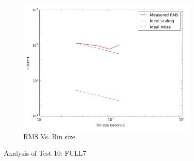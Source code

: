 \documentclass[conference]{IEEEtran}
\begin{document}
\begin{figure}[H]
    \begin{subfigure}{3}
        \includegraphics[scale=0.6]{rms_test10}
        \caption{RMS Vs. Bin size}
    \end{subfigure}
    \caption{Analysis of Test 10: FULL7}
\end{figure}
\end{document}
